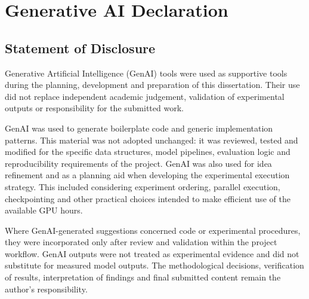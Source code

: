 \chapter{Generative AI Declaration}
\label{app:generative-ai}

\section{Statement of Disclosure}
\label{sec:app-generative-ai-disclosure}

Generative Artificial Intelligence (GenAI) tools were used as supportive tools during the planning, development and preparation of this dissertation. Their use did not replace independent academic judgement, validation of experimental outputs or responsibility for the submitted work.

GenAI was used to generate boilerplate code and generic implementation patterns. This material was not adopted unchanged: it was reviewed, tested and modified for the specific data structures, model pipelines, evaluation logic and reproducibility requirements of the project. GenAI was also used for idea refinement and as a planning aid when developing the experimental execution strategy. This included considering experiment ordering, parallel execution, checkpointing and other practical choices intended to make efficient use of the available GPU hours.

Where GenAI-generated suggestions concerned code or experimental procedures, they were incorporated only after review and validation within the project workflow. GenAI outputs were not treated as experimental evidence and did not substitute for measured model outputs. The methodological decisions, verification of results, interpretation of findings and final submitted content remain the author's responsibility.
